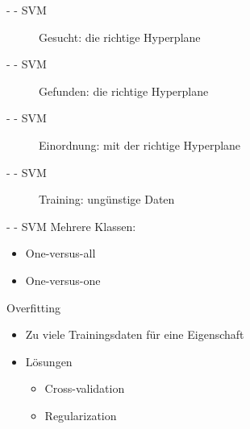 \documentclass[fleqn,11pt,aspectratio=43]{beamer}
\begin{document}
\begin{frame}{\insertsectionhead - \insertsubsectionhead - SVM}
\begin{figure}
\scalebox{.7}{}
\caption{Gesucht: die richtige Hyperplane}
\end{figure}
\end{frame}

\begin{frame}{\insertsectionhead - \insertsubsectionhead - SVM}
\begin{figure}
\scalebox{.8}{}
\caption{Gefunden: die richtige Hyperplane}
\end{figure}
\end{frame}

\begin{frame}{\insertsectionhead - \insertsubsectionhead - SVM}
\begin{figure}
\scalebox{.8}{}
\caption{Einordnung: mit der richtige Hyperplane}
\end{figure}
\end{frame}

\begin{frame}{\insertsectionhead - \insertsubsectionhead - SVM}
\begin{figure}
\scalebox{1.0}{}
\caption{Training: ungünstige Daten}
\end{figure}
\end{frame}

\begin{frame}{\insertsectionhead - \insertsubsectionhead - SVM \cite{dwh}}
Mehrere Klassen:
\begin{itemize}
\item One-versus-all
\item One-versus-one
\end{itemize}

Overfitting
\begin{itemize}
\item Zu viele Trainingsdaten für eine Eigenschaft
\item Lösungen
\begin{itemize}
\item Cross-validation
\item Regularization
\end{itemize} 
\end{itemize}
\end{frame}
\end{document}
